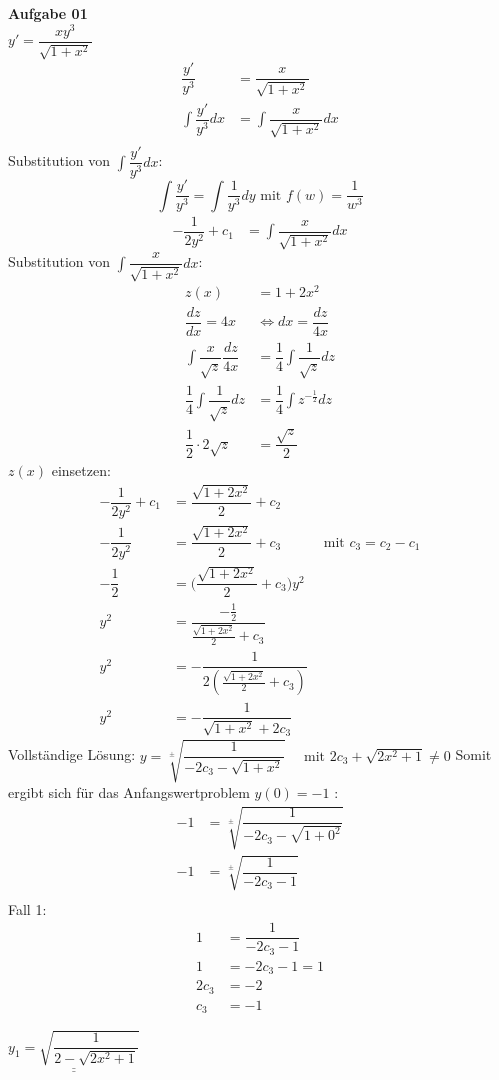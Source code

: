 \documentclass[a4paper,10pt]{article}
\begin{document}
	\parindent0pt
	\textbf{Aufgabe 01}\\
		$y' = \dfrac{xy^3}{\sqrt{1 + x^2}}$\\
	\begin{align*}
	\dfrac{y'}{y^3} & = \dfrac{x}{\sqrt{1 + x^2}}\\
	\int \dfrac{y'}{y^3}dx & = \int \dfrac{x}{\sqrt{1 + x^2}}dx\\
	\end{align*}
	Substitution von $\int \dfrac{y'}{y^3}dx$:
	\[\int \dfrac{y'}{y^3} = \int \dfrac{1}{y^3}dy \text{ mit } f(w) = \dfrac{1}{w^3} \]
	\begin{align*}
	-\dfrac{1}{2y^2} + c_1 & = \int \dfrac{x}{\sqrt{1 + x^2}}dx
	\end{align*}
	Substitution von $\int \dfrac{x}{\sqrt{1 + x^2}}dx$:
	\begin{align*}
	z(x)  & = 1 + 2x^2\\
	\dfrac{dz}{dx} = 4x & \Leftrightarrow dx = \dfrac{dz}{4x}\\
	\int \dfrac{x}{\sqrt{z}}\dfrac{dz}{4x} & = \dfrac{1}{4} \int \dfrac{1}{\sqrt{z}}dz\\
	\dfrac{1}{4} \int \dfrac{1}{\sqrt{z}}dz & = \dfrac{1}{4} \int z^{-\frac{1}{2}}dz\\
	\dfrac{1}{2} \cdot 2 \sqrt{z} & = \dfrac{\sqrt{z}}{2}
	\end{align*}
	$z(x)$ einsetzen:
	\begin{align*}
	-\dfrac{1}{2y^2} + c_1  & = \dfrac{\sqrt{1 + 2x^2}}{2} + c_2 \\
	-\dfrac{1}{2y^2} & = \dfrac{\sqrt{1 + 2x^2}}{2} + c_3 & \text{ mit } c_3 = c_2 - c_1 \\
	-\dfrac{1}{2} & = \Big (\dfrac{\sqrt{1 + 2x^2}}{2} + c_3 \Big)y^2\\
	y^2 & = \dfrac{-\frac{1}{2}}{\frac{\sqrt{1 + 2x^2}}{2} + c_3}\\
	y^2 & = - \dfrac{1}{2 (\frac{\sqrt{1 + 2x^2}}{2} + c_3)}\\
	y^2 & = - \dfrac{1}{\sqrt{1 + x^2} + 2c_3}
	\end{align*}
	Vollständige Lösung: $y = \sqrt[\pm]{\dfrac{1}{-2c_3 - \sqrt{1 + x^2}}} \quad \text{ mit } 2c_3 + \sqrt{2x^2 + 1} \neq 0$ 
	\newpage
	Somit ergibt sich für das Anfangswertproblem $y(0) = -1$ :
	\begin{align*}
	-1 & = \sqrt[\pm]{\dfrac{1}{-2c_3 - \sqrt{1 + 0^2}}}\\
	-1 & = \sqrt[\pm]{\dfrac{1}{-2c_3 - 1 }}\\
	\end{align*}
	Fall 1:
	\begin{align*}
	1 & = \dfrac{1}{-2c_3 - 1}\\
	1 & = -2c_3 - 1 = 1\\
	2c_3 & = -2\\
	c_3 & = -1
	\end{align*}
	\begin{center}
		$\underline{\underline{y_1 = \sqrt{\dfrac{1}{2 - \sqrt{2x^2 + 1}}}}}$
	\end{center}
	
\end{document}

